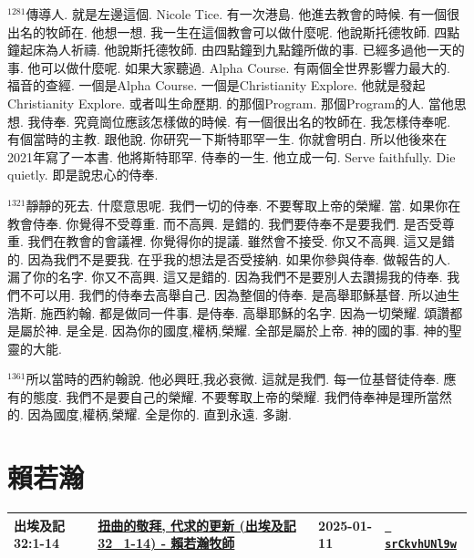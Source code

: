 \documentclass{book}
\begin{document}
$^{1281}$傳導人.
就是左邊這個.
Nicole Tice.
有一次港島.
他進去教會的時候.
有一個很出名的牧師在.
他想一想.
我一生在這個教會可以做什麼呢.
他說斯托德牧師.
四點鐘起床為人祈禱.
他說斯托德牧師.
由四點鐘到九點鐘所做的事.
已經多過他一天的事.
他可以做什麼呢.
如果大家聽過.
Alpha Course.
有兩個全世界影響力最大的.
福音的查經.
一個是Alpha Course.
一個是Christianity Explore.
他就是發起Christianity Explore.
或者叫生命歷期.
的那個Program.
那個Program的人.
當他思想.
我侍奉.
究竟崗位應該怎樣做的時候.
有一個很出名的牧師在.
我怎樣侍奉呢.
有個當時的主教.
跟他說.
你研究一下斯特耶罕一生.
你就會明白.
所以他後來在2021年寫了一本書.
他將斯特耶罕.
侍奉的一生.
他立成一句.
Serve faithfully.
Die quietly.
即是說忠心的侍奉.

$^{1321}$靜靜的死去.
什麼意思呢.
我們一切的侍奉.
不要奪取上帝的榮耀.
當.
如果你在教會侍奉.
你覺得不受尊重.
而不高興.
是錯的.
我們要侍奉不是要我們.
是否受尊重.
我們在教會的會議裡.
你覺得你的提議.
雖然會不接受.
你又不高興.
這又是錯的.
因為我們不是要我.
在乎我的想法是否受接納.
如果你參與侍奉.
做報告的人.
漏了你的名字.
你又不高興.
這又是錯的.
因為我們不是要別人去讚揚我的侍奉.
我們不可以用.
我們的侍奉去高舉自己.
因為整個的侍奉.
是高舉耶穌基督.
所以迪生浩斯.
施西約翰.
都是做同一件事.
是侍奉.
高舉耶穌的名字.
因為一切榮耀.
頌讚都是屬於神.
是全是.
因為你的國度,權柄,榮耀.
全部是屬於上帝.
神的國的事.
神的聖靈的大能.

$^{1361}$所以當時的西約翰說.
他必興旺,我必衰微.
這就是我們.
每一位基督徒侍奉.
應有的態度.
我們不是要自己的榮耀.
不要奪取上帝的榮耀.
我們侍奉神是理所當然的.
因為國度,權柄,榮耀.
全是你的.
直到永遠.
多謝.
\newpage



\chapter{賴若瀚}\label{ch:preacher8}
\begin{multicols}{3}
\minitoc
\end{multicols}
{ \scriptsize


\begin{xltabular}{\textwidth}{|p{0.15\textwidth} p{0.6\textwidth}|p{0.07\textwidth} p{0.1\textwidth}|}
\hline
出埃及記 32:1-14 & \hyperref[sec:srCkvhUNl9w]{扭曲的敬拜, 代求的更新 (出埃及記32\_1-14) -  賴若瀚牧師} & 2025-01-11 & \href{https://youtube.com/watch?v=srCkvhUNl9w}{\texttt{ srCkvhUNl9w}} \\
\hline
\end{xltabular}
}
\newpage
\end{document}
